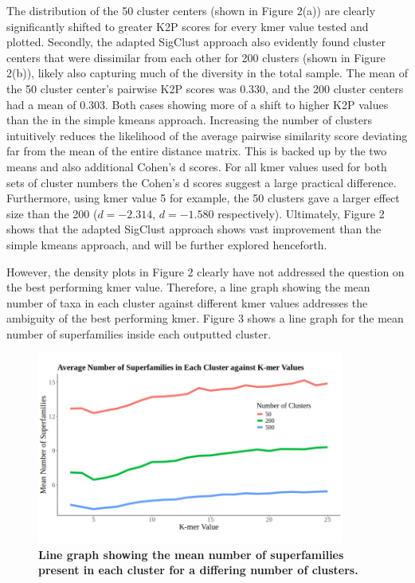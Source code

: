 \documentclass[12pt]{article}
\begin{document}
  The distribution of the 50 cluster centers (shown in Figure 2(a)) are clearly significantly shifted to greater K2P scores for every kmer value tested and plotted. Secondly, the adapted SigClust approach also evidently found cluster centers that were dissimilar from each other for 200 clusters (shown in Figure 2(b)), likely also capturing much of the diversity in the total sample. The mean of the 50 cluster center's pairwise K2P scores was 0.330, and the 200 cluster centers had a mean of 0.303. Both cases showing more of a shift to higher K2P values than the in the simple kmeans approach. Increasing the number of clusters intuitively reduces the likelihood of the average pairwise similarity score deviating far from the mean of the entire distance matrix. This is backed up by the two means and also additional Cohen's d scores. For all kmer values used for both sets of cluster numbers the Cohen's d scores suggest a large practical difference. Furthermore, using kmer value 5 for example, the 50 clusters gave a larger effect size than the 200 ($d = -2.314$, $d = -1.580$ respectively). Ultimately, Figure 2 shows that the adapted SigClust approach shows vast improvement than the simple kmeans approach, and will be further explored henceforth. 
  
  However, the density plots in Figure 2 clearly have not addressed the question on the best performing kmer value. Therefore, a line graph showing the mean number of taxa in each cluster against different kmer values addresses the ambiguity of the best performing kmer. Figure 3 shows a line graph for the mean number of superfamilies inside each outputted cluster. 

  \begin{figure}[H]
    \centering
    \includegraphics[width=0.9\textwidth]{Av_Super.png}
    \captionsetup{margin=0.75cm}
      \caption{\textbf{\small Line graph showing the mean number of superfamilies present in each cluster for a differing number of clusters.}}
\end{figure}
\end{document}
